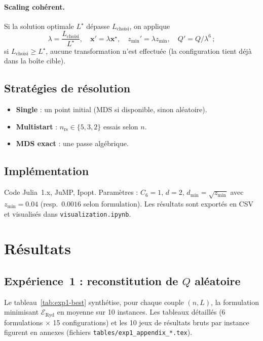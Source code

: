 \documentclass[11pt,a4paper]{article}
\theoremstyle{definition}
\theoremstyle{remark}
\newcommand{\cSix}{C_6}
\begin{document}
\paragraph{Scaling cohérent.}
Si la solution optimale $L^\star$ dépasse $L_{\mathrm{choisi}}$, on applique
\begin{equation}
  \lambda=\frac{L_{\mathrm{choisi}}}{L^\star},\quad
  \mathbf{x}'=\lambda\mathbf{x}^\star,\quad
  z_{\min}'=\lambda z_{\min},\quad
  Q'=Q/\lambda^{6}\,;
  \label{eq:scaling-coherent}
\end{equation}
si $L_{\mathrm{choisi}}\ge L^\star$, aucune transformation n'est effectuée
(la configuration tient déjà dans la boîte cible).

\subsection{Stratégies de résolution}
\begin{itemize}[leftmargin=*, itemsep=2pt]
  \item \textbf{Single} : un point initial (MDS si disponible, sinon aléatoire).
  \item \textbf{Multistart} : $n_{\mathrm{rs}} \in \{5,3,2\}$ essais selon $n$.
  \item \textbf{MDS exact} : une passe algébrique.
\end{itemize}

\subsection{Implémentation}
Code Julia~1.x, JuMP, Ipopt. Paramètres : $\cSix = 1$, $d = 2$,
$d_{\min} = \sqrt{z_{\min}}$ avec $z_{\min} = 0.04$ (resp.\ $0.0016$ selon
formulation). Les résultats sont exportés en CSV et visualisés dans
\texttt{visualization.ipynb}.

\section{Résultats}
\label{sec:resultats}

\subsection{Expérience~1 : reconstitution de $Q$ aléatoire}
\label{sec:res-exp1}

Le tableau~\ref{tab:exp1-best} synthétise, pour chaque couple $(n,L)$,
la formulation minimisant $\mathcal{E}_{\mathrm{Ryd}}$ en moyenne sur
10 instances. Les tableaux détaillés (6 formulations $\times$ 15
configurations) et les 10 jeux de résultats bruts par instance figurent
en annexes (fichiers \texttt{tables/exp1\_appendix\_*.tex}).
\end{document}
